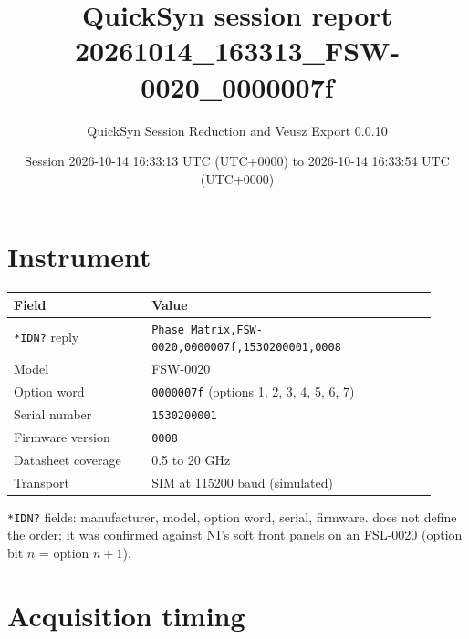 \documentclass[11pt]{article}
\title{QuickSyn session report\\[0.3em]\large 20261014\_163313\_FSW-0020\_0000007f}
\author{QuickSyn Session Reduction and Veusz Export 0.0.10}
\date{Session 2026-10-14 16:33:13 UTC (UTC+0000) to 2026-10-14 16:33:54 UTC (UTC+0000)}
\begin{document}
\maketitle
\thispagestyle{fancy}
\begin{center}\end{center}

\tableofcontents
\clearpage

\section{Instrument}

\begin{center}
\begin{tabular}{@{}p{0.3\linewidth}p{0.62\linewidth}@{}}
\toprule
\textbf{Field} & \textbf{Value} \\
\midrule
\texttt{*IDN?} reply & \texttt{Phase Matrix,FSW-0020,0000007f,1530200001,0008} \\
Model & FSW-0020 \\
Option word & \texttt{0000007f} (options 1, 2, 3, 4, 5, 6, 7) \\
Serial number & \texttt{1530200001} \\
Firmware version & \texttt{0008} \\
Datasheet coverage & 0.5 to 20 GHz \\
Transport & SIM at 115200 baud (simulated) \\
\bottomrule
\end{tabular}
\end{center}

\texttt{*IDN?} fields: manufacturer, model, option word, serial, firmware.
\cite{nicomms} does not define the order; it was confirmed against NI's
soft front panels on an FSL-0020 (option bit $n$ = option $n+1$).

\section{Acquisition timing}
\end{document}

